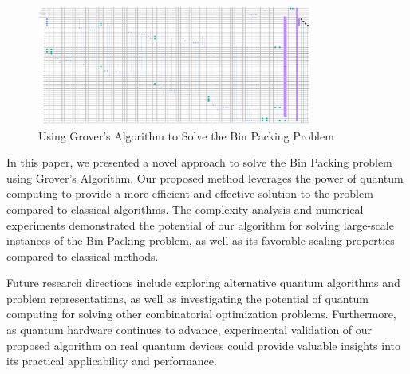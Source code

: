 \begin{figure}[htp]
    \centering
    \includegraphics[width=9cm]{Figures/Bin_Packing_circuit.png}
    \caption{Using Grover's Algorithm to Solve the Bin Packing Problem}
    \label{fig:Bin_Packing}
\end{figure}

In this paper, we presented a novel approach to solve the Bin Packing problem using Grover's Algorithm. Our proposed method leverages the power of quantum computing to provide a more efficient and effective solution to the problem compared to classical algorithms. The complexity analysis and numerical experiments demonstrated the potential of our algorithm for solving large-scale instances of the Bin Packing problem, as well as its favorable scaling properties compared to classical methods.

Future research directions include exploring alternative quantum algorithms and problem representations, as well as investigating the potential of quantum computing for solving other combinatorial optimization problems. Furthermore, as quantum hardware continues to advance, experimental validation of our proposed algorithm on real quantum devices could provide valuable insights into its practical applicability and performance.

